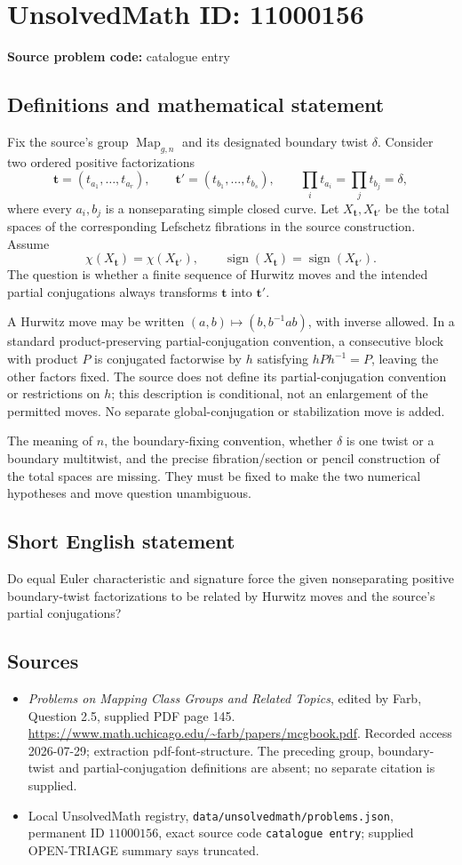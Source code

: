 \documentclass[11pt]{article}
\begin{document}
\section*{UnsolvedMath ID: 11000156}
\textbf{Source problem code:} catalogue entry
\subsection{Definitions and mathematical statement}
Fix the source's group \(\operatorname{Map}_{g,n}\) and its designated boundary twist \(\delta\). Consider two ordered positive factorizations
\[
 \mathbf t=(t_{a_1},\ldots,t_{a_r}),\qquad
 \mathbf t'=(t_{b_1},\ldots,t_{b_s}),\qquad
 \prod_i t_{a_i}=\prod_j t_{b_j}=\delta,
\]
where every \(a_i,b_j\) is a nonseparating simple closed curve. Let \(X_{\mathbf t},X_{\mathbf t'}\) be the total spaces of the corresponding Lefschetz fibrations in the source construction. Assume
\[
 \chi(X_{\mathbf t})=\chi(X_{\mathbf t'}),\qquad
 \operatorname{sign}(X_{\mathbf t})=\operatorname{sign}(X_{\mathbf t'}).
\]
The question is whether a finite sequence of Hurwitz moves and the intended partial conjugations always transforms \(\mathbf t\) into \(\mathbf t'\).

A Hurwitz move may be written \((a,b)\mapsto(b,b^{-1}ab)\), with inverse allowed. In a standard product-preserving partial-conjugation convention, a consecutive block with product \(P\) is conjugated factorwise by \(h\) satisfying \(hPh^{-1}=P\), leaving the other factors fixed. The source does not define its partial-conjugation convention or restrictions on \(h\); this description is conditional, not an enlargement of the permitted moves. No separate global-conjugation or stabilization move is added.

The meaning of \(n\), the boundary-fixing convention, whether \(\delta\) is one twist or a boundary multitwist, and the precise fibration/section or pencil construction of the total spaces are missing. They must be fixed to make the two numerical hypotheses and move question unambiguous.
\subsection{Short English statement}
Do equal Euler characteristic and signature force the given nonseparating positive boundary-twist factorizations to be related by Hurwitz moves and the source's partial conjugations?
\subsection{Sources}
\begin{itemize}
\item \emph{Problems on Mapping Class Groups and Related Topics}, edited by Farb, Question 2.5, supplied PDF page 145. \url{https://www.math.uchicago.edu/~farb/papers/mcgbook.pdf}. Recorded access 2026-07-29; extraction pdf-font-structure. The preceding group, boundary-twist and partial-conjugation definitions are absent; no separate citation is supplied.
\item Local UnsolvedMath registry, \texttt{data/unsolvedmath/problems.json}, permanent ID \(11000156\), exact source code \texttt{catalogue entry}; supplied OPEN-TRIAGE summary says truncated.
\end{itemize}
\end{document}
